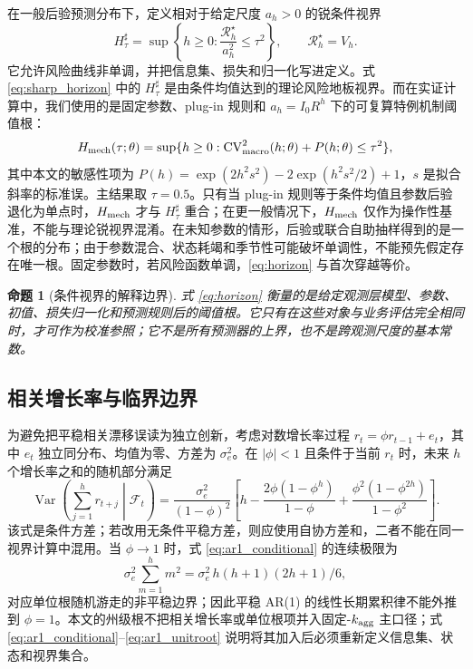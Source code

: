 \documentclass[11pt,a4paper]{article}
\newtheorem{proposition}[theorem]{命题}
\begin{document}
在一般后验预测分布下，定义相对于给定尺度 $a_h>0$ 的锐条件视界
\begin{equation}
H^\sharp_\tau=\sup\left\{h\geq0:\frac{\mathcal R_h^\star}{a_h^2}\leq\tau^2\right\},\qquad \mathcal R_h^\star=V_h.\label{eq:sharp_horizon}
\end{equation}
它允许风险曲线非单调，并把信息集、损失和归一化写进定义。式 \eqref{eq:sharp_horizon} 中的 $H_\tau^\sharp$ 是由条件均值达到的理论风险地板视界。而在实证计算中，我们使用的是固定参数、plug-in 规则和 $a_h=I_0R^h$ 下的可复算特例机制阈值根：
\begin{equation}
H_{\rm mech}(\tau;\theta)=\sup\{h\geq0:\operatorname{CV}^2_{\rm macro}(h;\theta)+P(h;\theta)\leq\tau^2\},\label{eq:horizon}
\end{equation}
其中本文的敏感性项为 $P(h)=\exp(2h^2s^2)-2\exp(h^2s^2/2)+1$，$s$ 是拟合斜率的标准误。主结果取 $\tau=0.5$。只有当 plug-in 规则等于条件均值且参数后验退化为单点时，$H_{\rm mech}$ 才与 $H_\tau^\sharp$ 重合；在更一般情况下，$H_{\rm mech}$ 仅作为操作性基准，不能与理论锐视界混淆。在未知参数的情形，后验或联合自助抽样得到的是一个根的分布；由于参数混合、状态耗竭和季节性可能破坏单调性，不能预先假定存在唯一根。固定参数时，若风险函数单调，\eqref{eq:horizon} 与首次穿越等价。

\begin{proposition}[条件视界的解释边界]
式 \eqref{eq:horizon} 衡量的是给定观测层模型、参数、初值、损失归一化和预测规则后的阈值根。它只有在这些对象与业务评估完全相同时，才可作为校准参照；它不是所有预测器的上界，也不是跨观测尺度的基本常数。
\end{proposition}

\subsection{相关增长率与临界边界}

为避免把平稳相关漂移误读为独立创新，考虑对数增长率过程 $r_t=\phi r_{t-1}+e_t$，其中 $e_t$ 独立同分布、均值为零、方差为 $\sigma_e^2$。在 $|\phi|<1$ 且条件于当前 $r_t$ 时，未来 $h$ 个增长率之和的随机部分满足
\begin{equation}
\operatorname{Var}\!\left(\sum_{j=1}^{h}r_{t+j}\middle|\mathcal F_t\right)
=\frac{\sigma_e^2}{(1-\phi)^2}\left[h-\frac{2\phi(1-\phi^h)}{1-\phi}+\frac{\phi^2(1-\phi^{2h})}{1-\phi^2}\right].\label{eq:ar1_conditional}
\end{equation}
该式是条件方差；若改用无条件平稳方差，则应使用自协方差和，二者不能在同一视界计算中混用。当 $\phi\to1$ 时，式 \eqref{eq:ar1_conditional} 的连续极限为
\begin{equation}
\sigma_e^2\sum_{m=1}^{h}m^2=\sigma_e^2\,h(h+1)(2h+1)/6,\label{eq:ar1_unitroot}
\end{equation}
对应单位根随机游走的非平稳边界；因此平稳 AR(1) 的线性长期累积律不能外推到 $\phi=1$。本文的州级根不把相关增长率或单位根项并入固定-$k_{\rm agg}$ 主口径；式 \eqref{eq:ar1_conditional}--\eqref{eq:ar1_unitroot} 说明将其加入后必须重新定义信息集、状态和视界集合。
\end{document}
